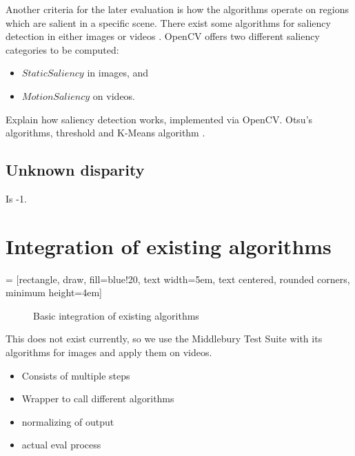 Another criteria for the later evaluation is how the algorithms operate on regions which are salient in a specific scene.
There exist some algorithms for saliency detection in either images or videos \citep{dittrich2013saliency, opencv_library}.
OpenCV offers two different saliency categories to be computed:
\begin{itemize}
  \item $StaticSaliency$ in images, and
  \item $MotionSaliency$ on videos.
\end{itemize}

\noindent Explain how saliency detection works, implemented via OpenCV. Otsu's algorithms, threshold and K-Means algorithm \citep{hou2007saliency}.

\subsection*{Unknown disparity}

Is -1.

\section{Integration of existing algorithms}

 = [rectangle, draw, fill=blue!20,
    text width=5em, text centered, rounded corners, minimum height=4em]

\begin{figure}[h]
  \centering
  \caption{Basic integration of existing algorithms}
  \label{fig:integration}
\end{figure}

This does not exist currently, so we use the Middlebury Test Suite with its algorithms for images and apply them on videos.

\begin{itemize}
	\item Consists of multiple steps
	\item Wrapper to call different algorithms
	\item normalizing of output
	\item actual eval process
\end{itemize}

